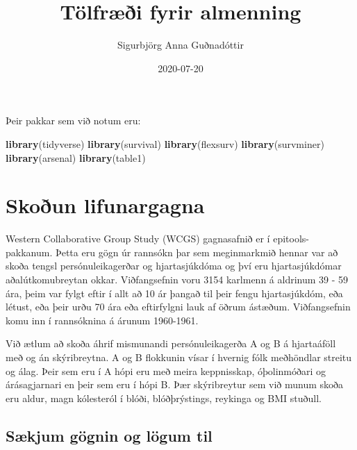 \documentclass[
]{book}
\title{Tölfræði fyrir almenning}
\author{Sigurbjörg Anna Guðnadóttir}
\date{2020-07-20}
\newenvironment{Shaded}{\begin{snugshade}}{\end{snugshade}}
\newcommand{\KeywordTok}[1]{\textcolor[rgb]{0.13,0.29,0.53}{\textbf{#1}}}
\newcommand{\NormalTok}[1]{#1}
\begin{document}
\maketitle

{
\setcounter{tocdepth}{1}
\tableofcontents
}
Þeir pakkar sem við notum eru:

\begin{Shaded}
\begin{Highlighting}[]
\KeywordTok{library}\NormalTok{(tidyverse)}
\KeywordTok{library}\NormalTok{(survival)}
\KeywordTok{library}\NormalTok{(flexsurv)}
\KeywordTok{library}\NormalTok{(survminer)}
\KeywordTok{library}\NormalTok{(arsenal)}
\KeywordTok{library}\NormalTok{(table1)}
\end{Highlighting}
\end{Shaded}

\hypertarget{lif_skod}{%
\chapter{Skoðun lifunargagna}\label{lif_skod}}

Western Collaborative Group Study (WCGS) gagnasafnið er í epitools- pakkanum. Þetta eru gögn úr rannsókn þar sem meginmarkmið hennar var að skoða tengsl persónuleikagerðar og hjartasjúkdóma og því eru hjartasjúkdómar aðalútkomubreytan okkar. Viðfangsefnin voru 3154 karlmenn á aldrinum 39 - 59 ára, þeim var fylgt eftir í allt að 10 ár þangað til þeir fengu hjartasjúkdóm, eða létust, eða þeir urðu 70 ára eða eftirfylgni lauk af öðrum ástæðum. Viðfangsefnin komu inn í rannsóknina á árunum 1960-1961.

Við ætlum að skoða áhrif mismunandi persónuleikagerða A og B á hjartaáföll með og án skýribreytna. A og B flokkunin vísar í hvernig fólk meðhöndlar streitu og álag. Þeir sem eru í A hópi eru með meira keppnisskap, óþolinmóðari og árásagjarnari en þeir sem eru í hópi B. Þær skýribreytur sem við munum skoða eru aldur, magn kólesteról í blóði, blóðþrýstings, reykinga og BMI stuðull.

\hypertarget{suxe6kjum-guxf6gnin-og-luxf6gum-til}{%
\section{Sækjum gögnin og lögum til}\label{suxe6kjum-guxf6gnin-og-luxf6gum-til}}
\end{document}
